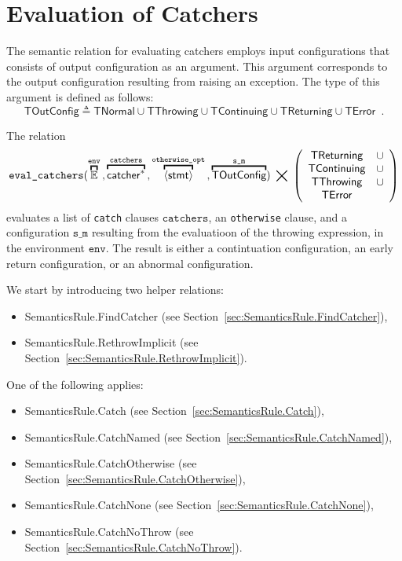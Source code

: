 \documentclass{book}
\newcommand\secref[1]{Section~\ref{sec:#1}}
\newcommand\overname[2]{\overbracket{#1}^{#2}}
\newcommand\aslrel[0]{\bigtimes}
\newcommand\aslsep[0]{\mathbf{,}}
\newcommand\TNormal[0]{\textsf{TNormal}}
\newcommand\TError[0]{\textsf{TError}}
\newcommand\TThrowing[0]{\textsf{TThrowing}}
\newcommand\TContinuing[0]{\textsf{TContinuing}}
\newcommand\TReturning[0]{\textsf{TReturning}}
\newcommand\TOutConfig[0]{\textsf{TOutConfig}}
\newcommand\evalcatchers[1]{\texttt{eval\_catchers}(#1)}
\newcommand\env[0]{\texttt{env}}
\newcommand\catchers[0]{\texttt{catchers}}
\newcommand\otherwiseopt[0]{\texttt{otherwise\_opt}}
\newcommand\sm[0]{\texttt{s\_m}}
\begin{document}
\chapter{Evaluation of Catchers \label{chap:eval_catchers}}

The semantic relation for evaluating catchers employs input configurations
that consists of output configuration as an argument.
This argument corresponds to the output configuration resulting from raising
an exception.
The type of this argument is defined as follows:
\[
  \TOutConfig \triangleq \TNormal \cup  \TThrowing \cup \TContinuing \cup \TReturning \cup \TError \enspace.
\]

The relation
\[
  \evalcatchers{\overname{\envs}{\env} \aslsep \overname{\catcher^*}{\catchers} \aslsep \overname{\langle\stmt\rangle}{\otherwiseopt}
   \aslsep \overname{\TOutConfig}{\sm}} \;\aslrel\;
  \left(
    \begin{array}{cl}
      \TReturning   & \cup\\
      \TContinuing  & \cup\\
      \TThrowing    & \cup \\
      \TError       &
    \end{array}
  \right)
\]
evaluates a list of \texttt{catch} clauses $\catchers$, an \texttt{otherwise} clause,
and a configuration $\sm$ resulting from the evaluatioon of the throwing expression,
in the environment $\env$. The result is either a contintuation configuration,
an early return configuration, or an abnormal configuration.

We start by introducing two helper relations:
\begin{itemize}
  \item SemanticsRule.FindCatcher (see \secref{SemanticsRule.FindCatcher}),
  \item SemanticsRule.RethrowImplicit (see \secref{SemanticsRule.RethrowImplicit}).
\end{itemize}

One of the following applies:
\begin{itemize}
\item SemanticsRule.Catch (see \secref{SemanticsRule.Catch}),
\item SemanticsRule.CatchNamed (see \secref{SemanticsRule.CatchNamed}),
\item SemanticsRule.CatchOtherwise (see \secref{SemanticsRule.CatchOtherwise}),
\item SemanticsRule.CatchNone (see \secref{SemanticsRule.CatchNone}),
\item SemanticsRule.CatchNoThrow (see \secref{SemanticsRule.CatchNoThrow}).
\end{itemize}
\end{document}
